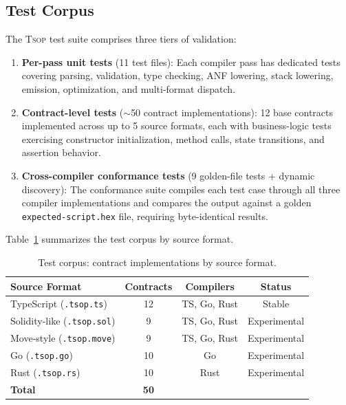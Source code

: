 \documentclass[11pt,a4paper]{article}
\newcommand{\tsop}{\textsc{Tsop}}
\begin{document}
\subsection{Test Corpus}
\label{sec:eval-corpus}

The \tsop{} test suite comprises three tiers of validation:

\begin{enumerate}[nosep]
  \item \textbf{Per-pass unit tests} (11 test files): Each compiler pass has
    dedicated tests covering parsing, validation, type checking, ANF lowering,
    stack lowering, emission, optimization, and multi-format dispatch.
  \item \textbf{Contract-level tests} ($\sim$50 contract implementations):
    12 base contracts implemented across up to 5 source formats, each with
    business-logic tests exercising constructor initialization, method calls,
    state transitions, and assertion behavior.
  \item \textbf{Cross-compiler conformance tests} (9 golden-file tests +
    dynamic discovery): The conformance suite compiles each test case through
    all three compiler implementations and compares the output against a
    golden \texttt{expected-script.hex} file, requiring byte-identical results.
\end{enumerate}

Table~\ref{tab:corpus} summarizes the test corpus by source format.

\begin{table}[h]
\centering
\small
\begin{tabular}{@{}lccc@{}}
\toprule
\textbf{Source Format} & \textbf{Contracts} & \textbf{Compilers} & \textbf{Status} \\
\midrule
TypeScript (\texttt{.tsop.ts}) & 12 & TS, Go, Rust & Stable \\
Solidity-like (\texttt{.tsop.sol}) & 9 & TS, Go, Rust & Experimental \\
Move-style (\texttt{.tsop.move}) & 9 & TS, Go, Rust & Experimental \\
Go (\texttt{.tsop.go}) & 10 & Go & Experimental \\
Rust (\texttt{.tsop.rs}) & 10 & Rust & Experimental \\
\midrule
\textbf{Total} & \textbf{50} & & \\
\bottomrule
\end{tabular}
\caption{Test corpus: contract implementations by source format.}
\label{tab:corpus}
\end{table}
\end{document}
